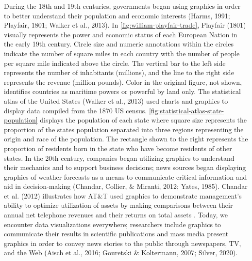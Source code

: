 \documentclass[print]{nuthesis}
\begin{document}
During the 18th and 19th centuries, governments began using graphics in order to better understand their population and economic interests (Harms, 1991; Playfair, 1801; Walker et al., 2013).
In \cref{fig:william-playfair-trade}, Playfair (1801) visually represents the power and economic status of each European Nation in the early 19th century.
Circle size and numeric annotations within the circles indicate the number of square miles in each country with the number of people per square mile indicated above the circle. 
The vertical bar to the left side represents the number of inhabitants (millions), and the line to the right side represents the revenue (million pounds).
Color in the original figure, not shown, identifies countries as maritime powers or powerful by land only.
The statistical atlas of the United States (Walker et al., 2013) used charts and graphics to display data compiled from the 1870 US census.
\cref{fig:statistical-atlas-state-population} displays the population of each state where square size represents the proportion of the states population separated into three regions representing the origin and race of the population.
The rectangle shown to the right represents the proportion of residents born in the state who have become residents of other states.
In the 20th century, companies began utilizing graphics to understand their mechanics and to support business decisions; news sources began displaying graphics of weather forecasts as a means to communicate critical information and aid in decision-making (Chandar, Collier, \& Miranti, 2012; Yates, 1985).
Chandar et al. (2012) illustrates how AT\&T used graphics to demonstrate management's ability to optimize utilization of assets by making comparisons between their annual net telephone revenues and their returns on total assets .
Today, we encounter data visualizations everywhere; researchers include graphics to communicate their results in scientific publications and mass media present graphics in order to convey news stories to the public through newspapers, TV, and the Web (Aisch et al., 2016; Gouretski \& Koltermann, 2007; Silver, 2020).
\end{document}
